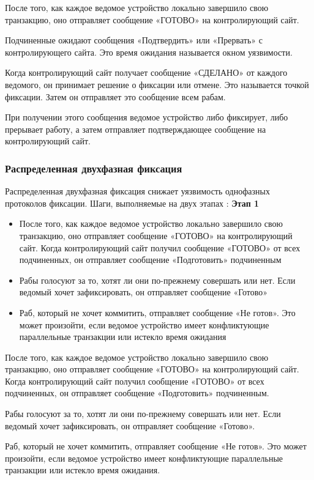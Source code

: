 После того, как каждое ведомое устройство локально завершило свою транзакцию, оно отправляет сообщение
«ГОТОВО» на контролирующий сайт.

Подчиненные ожидают сообщения «Подтвердить» или «Прервать» с контролирующего сайта. Это время ожидания
называется окном уязвимости.

Когда контролирующий сайт получает сообщение «СДЕЛАНО» от каждого ведомого, он принимает решение о
фиксации или отмене. Это называется точкой фиксации. Затем он отправляет это сообщение всем рабам.

При получении этого сообщения ведомое устройство либо фиксирует, либо прерывает работу,
а затем отправляет подтверждающее сообщение на контролирующий сайт.

\bigbreak
\subsubsection{Распределенная двухфазная фиксация}
Распределенная двухфазная фиксация снижает уязвимость однофазных протоколов фиксации. Шаги, выполняемые на двух этапах \autocite{FixProtocols}:
\bigbreak
\textbf{Этап 1}
\begin{itemize}
    \item После того, как каждое ведомое устройство локально завершило свою транзакцию,
    оно отправляет сообщение «ГОТОВО» на контролирующий сайт. Когда контролирующий сайт получил сообщение «ГОТОВО»
    от всех подчиненных, он отправляет сообщение «Подготовить» подчиненным
    \item Рабы голосуют за то, хотят ли они по-прежнему совершать или нет. Если ведомый
    хочет зафиксировать, он отправляет сообщение «Готово»
    \item Раб, который не хочет коммитить, отправляет сообщение «Не готов». Это может произойти,
    если ведомое устройство имеет конфликтующие параллельные транзакции или истекло время ожидания
\end{itemize}

После того, как каждое ведомое устройство локально завершило свою транзакцию, оно отправляет
сообщение «ГОТОВО» на контролирующий сайт. Когда контролирующий сайт получил сообщение «ГОТОВО» от всех подчиненных,
он отправляет сообщение «Подготовить» подчиненным.

Рабы голосуют за то, хотят ли они по-прежнему совершать или нет. Если ведомый хочет зафиксировать,
он отправляет сообщение «Готово».

Раб, который не хочет коммитить, отправляет сообщение «Не готов». Это может произойти, если ведомое
устройство имеет конфликтующие параллельные транзакции или истекло время ожидания.

